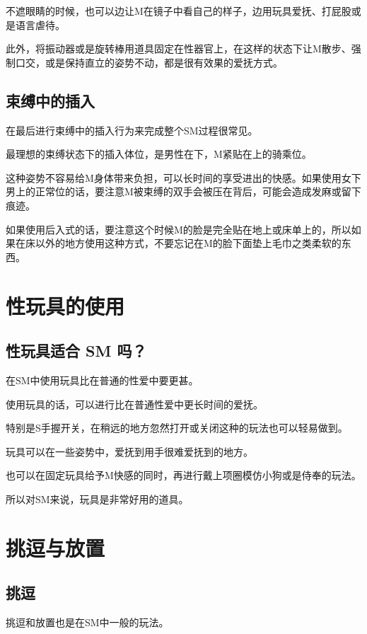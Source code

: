\documentclass[12pt,UTF8]{ctexbook}
\begin{document}
不遮眼睛的时候，也可以边让M在镜子中看自己的样子，边用玩具爱抚、打屁股或是语言虐待。

此外，将振动器或是旋转棒用道具固定在性器官上，在这样的状态下让M散步、强制口交，或是保持直立的姿势不动，都是很有效果的爱抚方式。 

\subsection{束缚中的插入}

在最后进行束缚中的插入行为来完成整个SM过程很常见。

最理想的束缚状态下的插入体位，是男性在下，M紧贴在上的骑乘位。

这种姿势不容易给M身体带来负担，可以长时间的享受进出的快感。如果使用女下男上的正常位的话，要注意M被束缚的双手会被压在背后，可能会造成发麻或留下痕迹。

如果使用后入式的话，要注意这个时候M的脸是完全贴在地上或床单上的，所以如果在床以外的地方使用这种方式，不要忘记在M的脸下面垫上毛巾之类柔软的东西。

\section{性玩具的使用}

\subsection{性玩具适合 SM 吗？}

在SM中使用玩具比在普通的性爱中要更甚。

使用玩具的话，可以进行比在普通性爱中更长时间的爱抚。

特别是S手握开关，在稍远的地方忽然打开或关闭这种的玩法也可以轻易做到。

玩具可以在一些姿势中，爱抚到用手很难爱抚到的地方。

也可以在固定玩具给予M快感的同时，再进行戴上项圈模仿小狗或是侍奉的玩法。

所以对SM来说，玩具是非常好用的道具。

\section{挑逗与放置}

\subsection{挑逗}

挑逗和放置也是在SM中一般的玩法。
\end{document}
